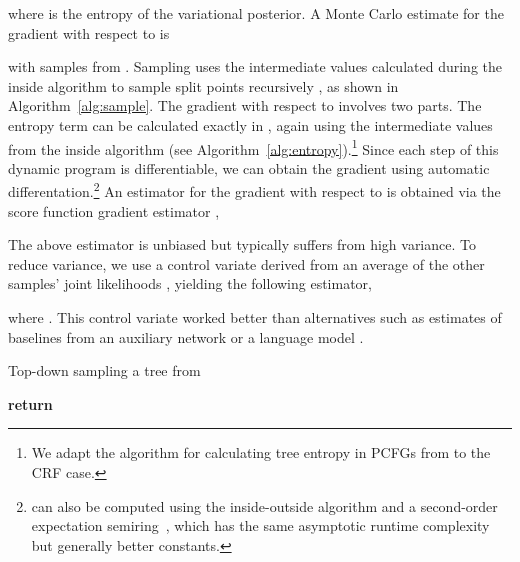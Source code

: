 \documentclass[11pt,a4paper]{article}
\begin{document}
where  is the entropy of the variational posterior.
A Monte Carlo estimate for the gradient with respect to  is
\vspace{-2mm}

with samples  from
. Sampling uses the intermediate values
calculated during the inside algorithm to sample split points
recursively \cite{goodman1998parsing,finkel2006}, 
as shown in Algorithm~\ref{alg:sample}.  The gradient with
respect to  involves two parts. The entropy term
 can be calculated exactly
in , again using the intermediate values from the inside
algorithm (see Algorithm~\ref{alg:entropy}).\footnote{We adapt the algorithm for calculating tree entropy in PCFGs from \citet{hwa2000entropy} to the CRF case.} Since each step of this dynamic program is
differentiable, we can obtain the gradient
 using
automatic differentation.\footnote{ can also be computed using the inside-outside algorithm and a second-order expectation semiring~\cite{li:2009}, which has the same asymptotic runtime complexity but generally better constants.} An estimator for the gradient with
respect to
 is
obtained via the score function gradient estimator
\cite{glynn1987ratio,williams1992reinforce}, \vspace{-1.5mm}

The above estimator is unbiased but typically suffers from high variance.
To reduce variance, we use a control variate derived from an average of the other samples' joint likelihoods \cite{mnih2016vimco}, yielding the following estimator,
\vspace{-1.5mm}

where .
This control variate worked better than alternatives such as estimates of
baselines from an auxiliary network \cite{mnih2014neural,deng2018} or a language model \cite{yin2018structvae}.

\begin{algorithm}[t]
    \caption{Top-down sampling a tree from }
    \label{alg:sample}
    \begin{algorithmic}[1]  
        \State  {}
        \State  {}
        \State 
        \State 
             
            \State 
                     \EndFor
        \State  {}
        \State  {}
        \If{} 
        \State  {}
                \EndIf
        \If{} 
        \State   {}
        \EndIf
            \EndWhile
            \State  {}
            \State \textbf{return} 
        \EndProcedure
    \end{algorithmic}
\end{algorithm}
\end{document}
